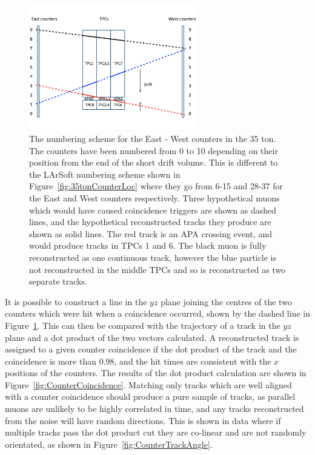 \begin{figure}
  \centering
  \includegraphics[width=0.65\textwidth]{CounterSchematic}
  \caption[The numbering scheme for the East - West counters in the 35 ton]
          {The numbering scheme for the East - West counters in the 35 ton. The counters have been numbered from 0 to 10 depending on their position from the end of the short drift volume. This is different to the LArSoft numbering scheme shown in Figure~\ref{fig:35tonCounterLoc} where they go from 6-15 and 28-37 for the East and West counters respectively. Three hypothetical muons which would have caused coincidence triggers are shown as dashed lines, and the hypothetical reconstructed tracks they produce are shown as solid lines. The red track is an APA crossing event, and would produce tracks in TPCs 1 and 6. The black muon is fully reconstructed as one continuous track, however the blue particle is not reconstructed in the middle TPCs and so is reconstructed as two separate tracks.}
  \label{fig:EWCounters}
\end{figure}

It is possible to construct a line in the $yz$ plane joining the centres of the two counters which were hit when a coincidence occurred, shown by the dashed line in Figure~\ref{fig:EWCounters}. This can then be compared with the trajectory of a track in the $yz$ plane and a dot product of the two vectors calculated. A reconstructed track is assigned to a given counter coincidence if the dot product of the track and the coincidence is more than 0.98, and the hit times are consistent with the $x$ positions of the counters. The results of the dot product calculation are shown in Figure~\ref{fig:CounterCoincidence}. Matching only tracks which are well aligned with a counter coincidence should produce a pure sample of tracks, as parallel muons are unlikely to be highly correlated in time, and any tracks reconstructed from the noise will have random directions. This is shown in data where if multiple tracks pass the dot product cut they are co-linear and are not randomly orientated, as shown in Figure~\ref{fig:CounterTrackAngle}. \\

